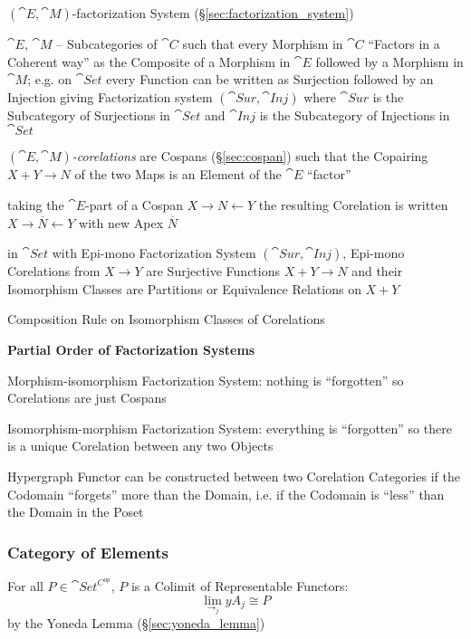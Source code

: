 
$(\cat{E},\cat{M})$-factorization System
(\S\ref{sec:factorization_system})

$\cat{E}$, $\cat{M}$ -- Subcategories of $\cat{C}$ such that every
Morphism in $\cat{C}$ ``Factors in a Coherent way'' as the Composite
of a Morphism in $\cat{E}$ followed by a Morphism in $\cat{M}$; e.g.
on $\cat{Set}$ every Function can be written as Surjection followed by
an Injection giving Factorization system $(\cat{Sur},\cat{Inj})$ where
$\cat{Sur}$ is the Subcategory of Surjections in $\cat{Set}$ and
$\cat{Inj}$ is the Subcategory of Injections in $\cat{Set}$

\emph{$(\cat{E},\cat{M})$-corelations} are Cospans
(\S\ref{sec:cospan}) such that the Copairing $X + Y \rightarrow N$ of
the two Maps is an Element of the $\cat{E}$ ``factor''

taking the $\cat{E}$-part of a Cospan $X \rightarrow N \leftarrow Y$
the resulting Corelation is written $X \rightarrow \overline{N}
\leftarrow Y$ with new Apex $\overline{N}$

in $\cat{Set}$ with Epi-mono Factorization System $(\cat{Sur},
\cat{Inj})$, Epi-mono Corelations from $X \rightarrow Y$ are
Surjective Functions $X + Y \rightarrow N$ and their Isomorphism
Classes are Partitions or Equivalence Relations on $X + Y$

Composition Rule on Isomorphism Classes of Corelations %


\textbf{Partial Order of Factorization Systems} %

Morphism-isomorphism Factorization System: nothing is ``forgotten'' so
Corelations are just Cospans

Isomorphism-morphism Factorization System: everything is ``forgotten''
so there is a unique Corelation between any two Objects

Hypergraph Functor can be constructed between two Corelation
Categories if the Codomain ``forgets'' more than the Domain, i.e. if
the Codomain is ``less'' than the Domain in the Poset



\subsubsection{Category of Elements}\label{sec:element_category}

For all $P \in \cat{Set^{C^{op}}}$, $P$ is a Colimit of
Representable Functors:
\[
  \lim_{\rightarrow_j} yA_j \cong P
\]
by the Yoneda Lemma (\S\ref{sec:yoneda_lemma})

